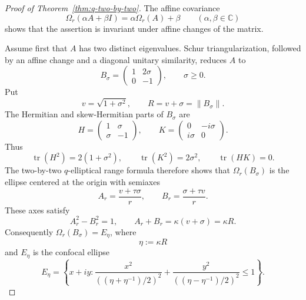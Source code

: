 \documentclass[11pt]{article}
\theoremstyle{remark}
\begin{document}
\begin{proof}[Proof of Theorem~\ref{thm:q-two-by-two}]
The affine covariance
\[
  \Omega_r(\alpha A+\beta I)
  =\alpha\Omega_r(A)+\beta
  \qquad(\alpha,\beta\in\mathbb C)
\]
shows that the assertion is invariant under affine changes of the
matrix.

Assume first that \(A\) has two distinct eigenvalues.  Schur
triangularization, followed by an affine change and a diagonal unitary
similarity, reduces \(A\) to
\[
  B_\sigma=
  \begin{pmatrix}
    1&2\sigma\\
    0&-1
  \end{pmatrix},
  \qquad \sigma\geq0.
\]
Put
\[
  v=\sqrt{1+\sigma^2},\qquad R=v+\sigma=\|B_\sigma\|.
\]
The Hermitian and skew-Hermitian parts of \(B_\sigma\) are
\[
  H=
  \begin{pmatrix}
    1&\sigma\\
    \sigma&-1
  \end{pmatrix},
  \qquad
  K=
  \begin{pmatrix}
    0&-i\sigma\\
    i\sigma&0
  \end{pmatrix}.
\]
Thus
\[
  \operatorname{tr}(H^2)=2(1+\sigma^2),\qquad
  \operatorname{tr}(K^2)=2\sigma^2,\qquad
  \operatorname{tr}(HK)=0.
\]
The two-by-two \(q\)-elliptical range formula
\cite[Lemma~6]{ChienNakazatoPsarrakos2005} therefore shows that
\(\Omega_r(B_\sigma)\) is the ellipse centered at the origin with
semiaxes
\begin{equation}
\label{eq:q-ellipse-axes}
  A_r=\frac{v+\tau\sigma}{r},
  \qquad
  B_r=\frac{\sigma+\tau v}{r}.
\end{equation}
These axes satisfy
\[
  A_r^2-B_r^2=1,
  \qquad
  A_r+B_r=\kappa(v+\sigma)=\kappa R.
\]
Consequently \(\Omega_r(B_\sigma)=E_\eta\), where
\[
  \eta:=\kappa R
\]
and \(E_\eta\) is the confocal ellipse
\[
  E_\eta=
  \left\{x+iy:
  \frac{x^2}{((\eta+\eta^{-1})/2)^2}
  +
  \frac{y^2}{((\eta-\eta^{-1})/2)^2}
  \leq1
  \right\}.
\]


\end{proof}
\end{document}
